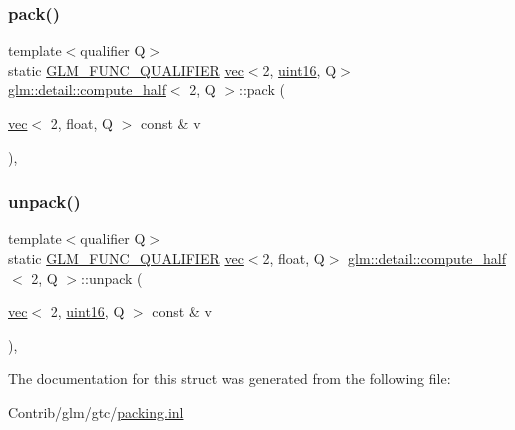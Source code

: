 \subsubsection{\texorpdfstring{pack()}{pack()}}
{\footnotesize\ttfamily template$<$qualifier Q$>$ \\
static \mbox{\hyperlink{setup_8hpp_a33fdea6f91c5f834105f7415e2a64407}{G\+L\+M\+\_\+\+F\+U\+N\+C\+\_\+\+Q\+U\+A\+L\+I\+F\+I\+ER}} \mbox{\hyperlink{structglm_1_1vec}{vec}}$<$2, \mbox{\hyperlink{namespaceglm_1_1detail_a47b2a7d006d187338e8031a352d1ce56}{uint16}}, Q$>$ \mbox{\hyperlink{structglm_1_1detail_1_1compute__half}{glm\+::detail\+::compute\+\_\+half}}$<$ 2, Q $>$\+::pack (\begin{DoxyParamCaption}\item[{\mbox{\hyperlink{structglm_1_1vec}{vec}}$<$ 2, float, Q $>$ const \&}]{v }\end{DoxyParamCaption})\hspace{0.3cm}{\ttfamily [inline]}, {\ttfamily [static]}}

\mbox{\label{structglm_1_1detail_1_1compute__half_3_012_00_01_q_01_4_a14c541423f621ba292c968245435c6a7}} 
\subsubsection{\texorpdfstring{unpack()}{unpack()}}
{\footnotesize\ttfamily template$<$qualifier Q$>$ \\
static \mbox{\hyperlink{setup_8hpp_a33fdea6f91c5f834105f7415e2a64407}{G\+L\+M\+\_\+\+F\+U\+N\+C\+\_\+\+Q\+U\+A\+L\+I\+F\+I\+ER}} \mbox{\hyperlink{structglm_1_1vec}{vec}}$<$2, float, Q$>$ \mbox{\hyperlink{structglm_1_1detail_1_1compute__half}{glm\+::detail\+::compute\+\_\+half}}$<$ 2, Q $>$\+::unpack (\begin{DoxyParamCaption}\item[{\mbox{\hyperlink{structglm_1_1vec}{vec}}$<$ 2, \mbox{\hyperlink{namespaceglm_1_1detail_a47b2a7d006d187338e8031a352d1ce56}{uint16}}, Q $>$ const \&}]{v }\end{DoxyParamCaption})\hspace{0.3cm}{\ttfamily [inline]}, {\ttfamily [static]}}



The documentation for this struct was generated from the following file\+:\begin{DoxyCompactItemize}
\item 
Contrib/glm/gtc/\mbox{\hyperlink{packing_8inl}{packing.\+inl}}\end{DoxyCompactItemize}
